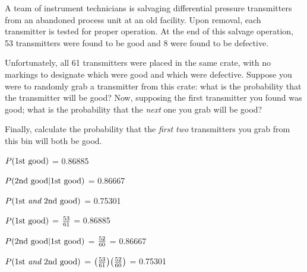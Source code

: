 

A team of instrument technicians is salvaging differential pressure transmitters from an abandoned process unit at an old facility.  Upon removal, each transmitter is tested for proper operation.  At the end of this salvage operation, 53 transmitters were found to be good and 8 were found to be defective.

Unfortunately, all 61 transmitters were placed in the same crate, with no markings to designate which were good and which were defective.  Suppose you were to randomly grab a transmitter from this crate: what is the probability that the transmitter will be good?  Now, supposing the first transmitter you found was good; what is the probability that the {\it next} one you grab will be good?

Finally, calculate the probability that the {\it first two} transmitters you grab from this bin will both be good.







$P(\hbox{1st good})$ = 0.86885

\vskip 10pt

$P(\hbox{2nd good} | \hbox{1st good})$ = 0.86667

\vskip 10pt

$P(\hbox{1st {\it and} 2nd good})$ = 0.75301







$P(\hbox{1st good})$ = $53 \over 61$ = 0.86885

\vskip 10pt

$P(\hbox{2nd good} | \hbox{1st good})$ = $52 \over 60$ = 0.86667

\vskip 10pt

$P(\hbox{1st {\it and} 2nd good})$ = ${\left( 53 \over 61 \right)}{\left( 52 \over 60 \right)}$ =  0.75301




